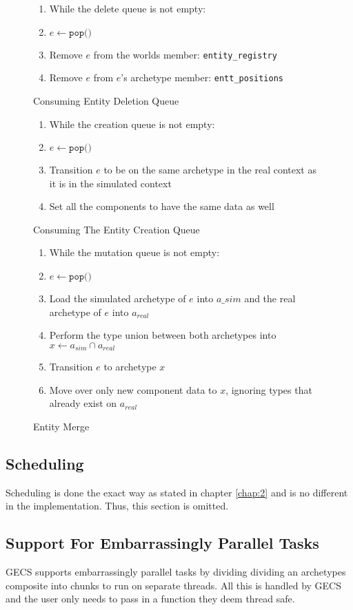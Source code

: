 \begin{figure}[htbp]
    \begin{enumerate}
        \item While the delete queue is not empty:
        \item $e \leftarrow \texttt{pop()}$
        \item Remove $e$ from the worlds member: \texttt{entity\_registry} 
        \item Remove $e$ from $e$'s archetype member: \texttt{entt\_positions} 
    \end{enumerate}
    \label{alg:entt_del_queue}
\caption{Consuming Entity Deletion Queue}
\end{figure}

\begin{figure}[htbp]
    \begin{enumerate}
        \item While the creation queue is not empty:
        \item $e \leftarrow \texttt{pop()}$
        \item Transition $e$ to be on the same archetype in the real context as it is in the simulated context
        \item Set all the components to have the same data as well
\end{enumerate}
\caption{Consuming The Entity Creation Queue}
\label{alg:entt_cre_queue}
\end{figure}

\begin{figure}[htbp]
\begin{enumerate}
    \item While the mutation queue is not empty:
    \item $e \leftarrow \texttt{pop()}$
    \item Load the simulated archetype of $e$ into $a\_{sim}$ and the real archetype of $e$ into $a_{real}$
    \item Perform the type union between both archetypes into $x \leftarrow a_{sim} \cap a_{real}$
    \item Transition $e$ to archetype $x$
    \item Move over only new component data to $x$, ignoring types that already exist on $a_{real}$
\end{enumerate}
\caption{Entity Merge}
\label{alg:entt_merge}
\end{figure}

\subsection{Scheduling}
Scheduling is done the exact way as stated in chapter \ref{chap:2} and is no different in the implementation. Thus, this section is omitted.

\subsection{Support For Embarrassingly Parallel Tasks}
GECS supports embarrassingly parallel tasks by dividing dividing an archetypes composite into chunks to run on separate threads. All this is handled by GECS and the user only needs to pass in a function they deem thread safe.